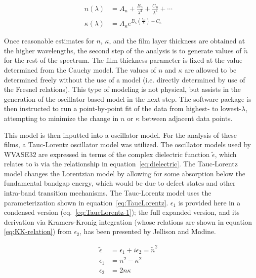 \begin{subequations}
\label{eq:cauchy}
\begin{align}
	n\left(\lambda\right) &= A_{n} + \frac{B_{n}}{\lambda^{2}}+\frac{C_{n}}{\lambda^{4}}+\cdots\\
        	\kappa\left(\lambda\right) &= A_{\kappa}e^{B_{\kappa}\left(\frac{hc}{\lambda}\right)-C_{\kappa}}
\end{align}
\end{subequations}

Once reasonable estimates for $n$, $\kappa$, and the film layer thickness are obtained at the higher wavelengths, the second step of the analysis is to generate values of $\tilde{n}$ for the rest of the spectrum. The film thickness parameter is fixed at the value determined from the Cauchy model. The values of $n$ and $\kappa$ are allowed to be determined freely without the use of a model (i.e. directly determined by use of the Fresnel relations). This type of modeling is not physical, but assists in the generation of the oscillator-based model in the next step. The software package is then instructed to run a point-by-point fit of the data from highest- to lowest-$\lambda$, attempting to minimize the change in $n$ or $\kappa$ between adjacent data points. 

This model is then inputted into a oscillator model. For the analysis of these films, a Tauc-Lorentz oscillator model was utilized. The oscillator models used by WVASE32 are expressed in terms of the complex dielectric function $\tilde{\epsilon}$, which relates to $\tilde{n}$ via the relationship in equation~\vref{eq:dielectric}. The Tauc-Lorentz model changes the Lorentzian model by allowing for some absorption below the fundamental bandgap energy, which would be due to defect states and other intra-band transition mechanisms. The Tauc-Lorentz model uses the parameterization shown in equation~\vref{eq:TaucLorentz}\cite{WVASE-manual,Jellison96}. $\epsilon_{1}$ is provided here in a condensed version (eq.~\vref{eq:TaucLorentz-1}); the full expanded version, and its derivation via Kramers-Kronig integration (whose relations are shown in equation \vref{eq:KK-relation}) from $\epsilon_{2}$, has been presented by Jellison and Modine\cite{Jellison96}. 

\begin{subequations}
\label{eq:dielectric}
\begin{align}
	\tilde{\epsilon} &= \epsilon_{1}+i\epsilon_{2} = \tilde{n}^{2}\\
	\epsilon_{1} &= n^{2} - \kappa^{2}\\
	\epsilon_{2} &= 2n\kappa 
\end{align}
\end{subequations}

